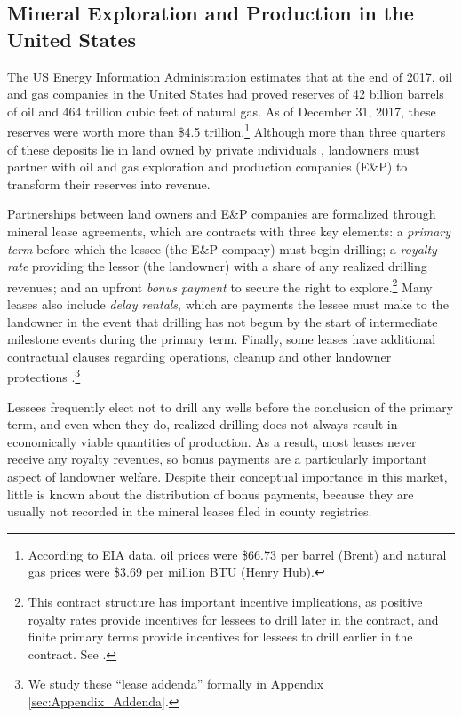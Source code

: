 \documentclass[12pt]{article}
\begin{document}
\subsection{Mineral Exploration and Production in the United States \label{sec:MineralBackground}}
The US Energy Information Administration estimates that at the end of 2017, oil and gas companies in the United States had proved reserves of 42 billion barrels of oil and 464 trillion cubic feet of natural gas. As of December 31, 2017, these reserves were worth more than \$4.5 trillion.\footnote{According to EIA data, oil prices were \$66.73 per barrel (Brent) and natural gas prices were \$3.69 per million BTU (Henry Hub).} Although more than three quarters of these deposits lie in land owned by private individuals \citep{fitzgerald_us_2016}, landowners must partner with oil and gas exploration and production companies (E\&P) to transform their reserves into revenue. 

Partnerships between land owners and E\&P companies are formalized through mineral lease agreements, which are contracts with three key elements: a \textit{primary term} before which the lessee (the E\&P company) must begin drilling; a \textit{royalty rate} providing the lessor (the landowner) with a share of any realized drilling revenues; and an upfront \textit{bonus payment} to secure the right to explore.\footnote{This contract structure has important incentive implications, as positive royalty rates provide incentives for lessees to drill later in the contract, and finite primary terms provide incentives for lessees to drill earlier in the contract.  See \citet{herrnstadt}.} Many leases also include \textit{delay rentals}, which are payments the lessee must make to the landowner in the event that drilling has not begun by the start of intermediate milestone events during the primary term. Finally, some leases have additional contractual clauses regarding operations, cleanup and other landowner protections \citep{vissing_one--many_2017}.\footnote{We study these ``lease addenda'' formally in Appendix \ref{sec:Appendix_Addenda}.} 

Lessees frequently elect not to drill any wells before the conclusion of the primary term, and even when they do, realized drilling does not always result in economically viable quantities of production. As a result, most leases never receive any royalty revenues, so bonus payments are a particularly important aspect of landowner welfare. Despite their conceptual importance in this market, little is known about the distribution of bonus payments, because they are usually not recorded in the mineral leases filed in county registries. 
\end{document}
